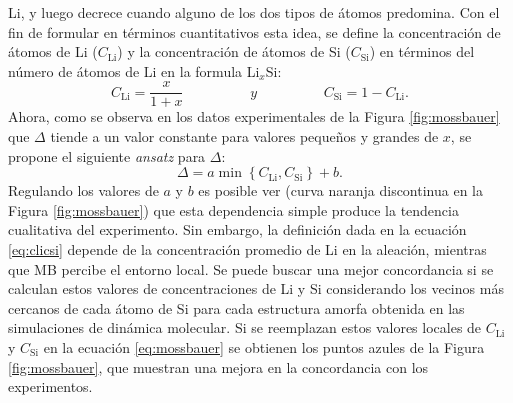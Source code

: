 Li, y luego decrece cuando alguno de los dos tipos de átomos predomina. Con el fin 
de formular en términos cuantitativos esta idea, se define la concentración de 
átomos de Li ($C_{\text{Li}}$) y la concentración de átomos de Si 
($C_{\text{Si}}$) en términos del número de átomos de Li en la formula Li$_x$Si:
\begin{equation}\label{eq:clicsi}
    C_{\text{Li}} = \frac{x}{1+x} \hspace{2cm}y \hspace{2cm}  C_{\text{Si}} = 1 - C_{\text{Li}}.
\end{equation}
Ahora, como se observa en los datos experimentales de la Figura \ref{fig:mossbauer}
que $\Delta$ tiende a un valor constante para valores pequeños y grandes de $x$, 
se propone el siguiente \textit{ansatz} para $\Delta$:
\begin{equation}\label{eq:mossbauer}
    \Delta = a\min\left\lbrace C_{\text{Li}},C_{\text{Si}}\right\rbrace + b.
\end{equation}
Regulando los valores de $a$ y $b$ es posible ver (curva naranja discontinua en 
la Figura \ref{fig:mossbauer}) que esta dependencia simple produce la tendencia 
cualitativa del experimento. Sin embargo, la definición dada en la ecuación 
\ref{eq:clicsi} depende de la concentración promedio de Li en la aleación, mientras que 
MB percibe el entorno local. Se puede buscar una mejor concordancia si se calculan 
estos valores de concentraciones de Li y Si considerando los vecinos más cercanos
de cada átomo de Si para cada estructura amorfa obtenida en las simulaciones de
dinámica molecular. Si se reemplazan estos valores locales de $C_{\text{Li}}$ y 
$C_{\text{Si}}$ en la ecuación \ref{eq:mossbauer} se obtienen los puntos azules
de la Figura \ref{fig:mossbauer}, que muestran una mejora en la concordancia 
con los experimentos.
